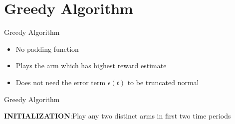 \documentclass[compress, serif, onlymath, professionalfonts]{beamer}
\begin{document}
\section{Greedy Algorithm}
\begin{frame}{Greedy Algorithm}
\begin{itemize}
\item No padding function
\item Plays the arm which has highest reward estimate 
\item Does not need the error term $\epsilon(t)$ to be truncated normal
\end{itemize}
\end{frame}

\begin{frame}{Greedy Algorithm}
\begin{algorithm}[H]
 \begin{footnotesize}
 
 

\label{algo_Greedy}
\textbf{INITIALIZATION}:Play any two distinct arms in first two time periods\;
 \end{footnotesize}
\end{algorithm}
\end{frame}
\end{document}
